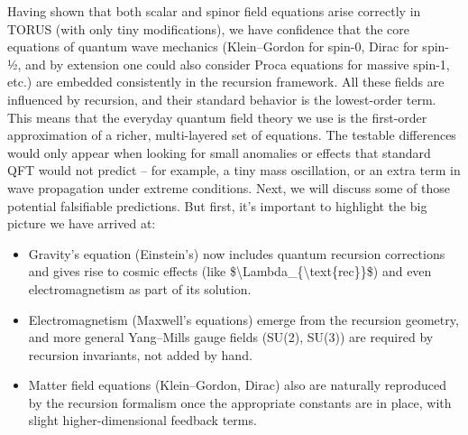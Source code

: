 \documentclass[
]{article}
\begin{document}
Having shown that both scalar and spinor field equations arise correctly
in TORUS (with only tiny modifications), we have confidence that the
core equations of quantum wave mechanics (Klein--Gordon for spin-0,
Dirac for spin-½, and by extension one could also consider Proca
equations for massive spin-1, etc.) are embedded consistently in the
recursion framework. All these fields are influenced by recursion, and
their standard behavior is the lowest-order term. This means that the
everyday quantum field theory we use is the first-order approximation of
a richer, multi-layered set of equations. The testable differences would
only appear when looking for small anomalies or effects that standard
QFT would not predict -- for example, a tiny mass oscillation, or an
extra term in wave propagation under extreme conditions. Next, we will
discuss some of those potential falsifiable predictions. But first, it's
important to highlight the big picture we have arrived at:

\begin{itemize}
\item
  Gravity's equation (Einstein's) now includes quantum recursion
  corrections and gives rise to cosmic effects (like
  \$\textbackslash Lambda\_\{\textbackslash text\{rec\}\}\$) and even
  electromagnetism as part of its solution.
\item
  Electromagnetism (Maxwell's equations) emerge from the recursion
  geometry, and more general Yang--Mills gauge fields (SU(2), SU(3)) are
  required by recursion invariants, not added by hand.
\item
  Matter field equations (Klein--Gordon, Dirac) also are naturally
  reproduced by the recursion formalism once the appropriate constants
  are in place, with slight higher-dimensional feedback terms.
\end{itemize}
\end{document}
